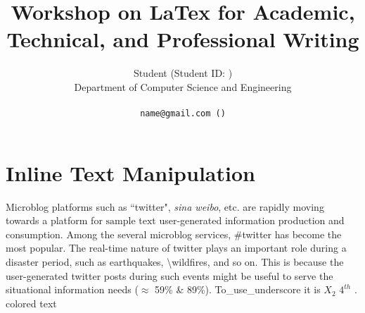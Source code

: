 \documentclass[11pt]{article}
\title{Workshop on LaTex for Academic, Technical, and Professional Writing}
\author{Student (Student ID:  ) \\
  Department of Computer Science and Engineering \\
  \affaddr{University of Chittagong, Chittagong, Bangladesh}\\
  {\tt name@gmail.com (\Letter)} \\
}
\begin{document}
\maketitle
\thispagestyle{plain}
\pagestyle{plain}

\section{Inline Text Manipulation}
\label{ref:inlineText}
Microblog platforms such as ``twitter", \emph{sina weibo}, etc. are rapidly moving towards a platform for $\mbox{sample text}$ user-generated information production and consumption. Among the several microblog services, \#twitter has become the most popular. The real-time nature of twitter plays an {\color{red} important role during a disaster period}, such as earthquakes, \textbackslash{wildfires}, and so on. This is because the user-generated twitter posts during such events might be useful to serve the situational information needs ($\approx$ 59\% \& 89\%). To\_use\_underscore it is $X_{2}$ $4^{th}$ .
{\color{blue} colored text}
\end{document}
